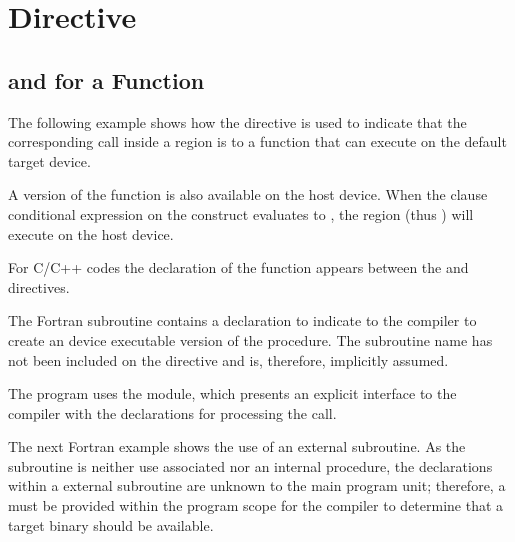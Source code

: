 \pagebreak
\section{  Directive}
\label{sec:declare_target}

\subsection{  and    for a Function}
\label{subsec:declare_target_function}

The following example shows how the   directive 
is used to indicate that the corresponding call inside a  region 
is to a  function that can execute on the default target device.

A version of the function is also available on the host device. When the  
clause conditional expression on the  construct evaluates to , 
the  region (thus ) will execute on the host device.

For C/C++ codes the declaration of the function  appears between the  
 and    directives.


The Fortran  subroutine contains a   declaration 
to indicate to the compiler to create an device executable version of the procedure. 
The subroutine name has not been included on the   
directive and is, therefore, implicitly assumed.

The program uses the  module, which presents an explicit interface to 
the compiler with the   declarations for processing 
the  call.


The next Fortran example shows the use of an external subroutine. As the subroutine
is neither use associated nor an internal procedure, the  
declarations within a external subroutine are unknown to the main program unit; 
therefore, a   must be provided within the program
scope for the compiler to determine that a target binary should be available.


